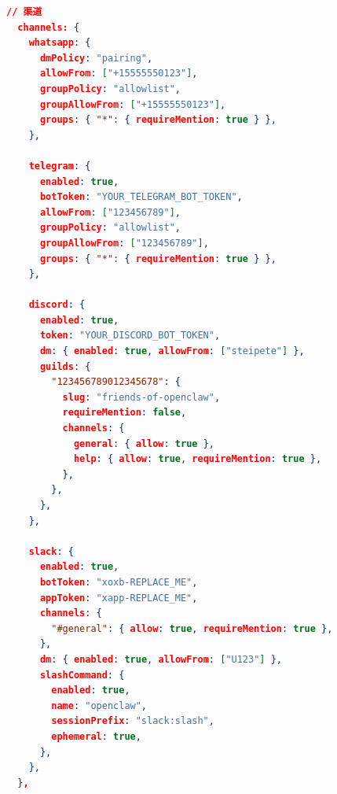 \begin{lstlisting}[language=json]
  // 渠道
  channels: {
    whatsapp: {
      dmPolicy: "pairing",
      allowFrom: ["+15555550123"],
      groupPolicy: "allowlist",
      groupAllowFrom: ["+15555550123"],
      groups: { "*": { requireMention: true } },
    },

    telegram: {
      enabled: true,
      botToken: "YOUR_TELEGRAM_BOT_TOKEN",
      allowFrom: ["123456789"],
      groupPolicy: "allowlist",
      groupAllowFrom: ["123456789"],
      groups: { "*": { requireMention: true } },
    },

    discord: {
      enabled: true,
      token: "YOUR_DISCORD_BOT_TOKEN",
      dm: { enabled: true, allowFrom: ["steipete"] },
      guilds: {
        "123456789012345678": {
          slug: "friends-of-openclaw",
          requireMention: false,
          channels: {
            general: { allow: true },
            help: { allow: true, requireMention: true },
          },
        },
      },
    },

    slack: {
      enabled: true,
      botToken: "xoxb-REPLACE_ME",
      appToken: "xapp-REPLACE_ME",
      channels: {
        "#general": { allow: true, requireMention: true },
      },
      dm: { enabled: true, allowFrom: ["U123"] },
      slashCommand: {
        enabled: true,
        name: "openclaw",
        sessionPrefix: "slack:slash",
        ephemeral: true,
      },
    },
  },


\end{lstlisting}
